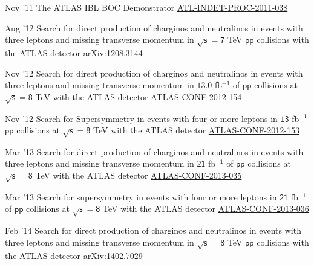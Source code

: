 \documentclass[]{cv} %
\begin{document}
\begin{entrylist}

  \entry
  {Nov '11}
  {{\normalfont The ATLAS IBL BOC Demonstrator}}
  {\href{https://cds.cern.ch/record/1401224}{ATL-INDET-PROC-2011-038}}
  {\vspace*{-8pt}}

  \entry
  {Aug '12}
  {{\normalfont Search for direct production of charginos and neutralinos in events with three leptons and missing transverse momentum in $\sqrt{\mathsf{s}} =
  \mathsf{7}$ TeV
  $\mathsf{pp}$ collisions with the ATLAS detector}}
  {\href{http://arxiv.org/abs/1208.3144}{arXiv:1208.3144}}
  {\vspace*{-8pt}}

  \entry
  {Nov '12}
  {{\normalfont Search for direct production of charginos and neutralinos in events with three leptons and missing transverse momentum in $\mathsf{13.0}$
  fb$^{\mathsf{-1}}$ of
  $\mathsf{pp}$ collisions at $\sqrt{\mathsf{s}}=\mathsf{8}$ TeV with the ATLAS detector}}
  {\href{https://cds.cern.ch/record/1493493}{ATLAS-CONF-2012-154}}
  {\vspace*{-8pt}}

  \entry
  {Nov '12}
  {{\normalfont Search for Supersymmetry in events with four or more leptons in $\mathsf{13}$ fb$^{\mathsf{-1}}$ $\mathsf{pp}$ collisions at $\sqrt{\mathsf{s}}
  = \mathsf{8}$ TeV with the ATLAS detector}}
  {\href{https://cds.cern.ch/record/1493492}{ATLAS-CONF-2012-153}}
  {\vspace*{-8pt}}

  \entry
  {Mar '13}
  {{\normalfont Search for direct production of charginos and neutralinos in events with three leptons and missing transverse momentum in $\mathsf{21}$
  fb$^{\mathsf{-1}}$ of $\mathsf{pp}$
  collisions at $\sqrt{\mathsf{s}}=\mathsf{8}$ TeV with the ATLAS detector}}
  {\href{https://cds.cern.ch/record/1532426}{ATLAS-CONF-2013-035}}
  {\vspace*{-8pt}}

  \entry
  {Mar '13}
  {{\normalfont Search for supersymmetry in events with four or more leptons in $\mathsf{21}$ fb$^{\mathsf{-1}}$ of $\mathsf{pp}$ collisions at
  $\sqrt{\mathsf{s}} = \mathsf{8}$ TeV with the ATLAS
detector}}
{\href{https://cds.cern.ch/record/1532429}{ATLAS-CONF-2013-036}}
{\vspace*{-8pt}}

  \entry
  {Feb '14}
  {{\normalfont Search for direct production of charginos and neutralinos in events with three leptons and missing transverse momentum in $\sqrt{\mathsf{s}} =
  \mathsf{8}$ TeV
  $\mathsf{pp}$ collisions with the ATLAS detector}}
  {\href{http://arxiv.org/abs/1402.7029}{arXiv:1402.7029}}
  {\vspace*{-8pt}}

\end{entrylist}
\end{document}
